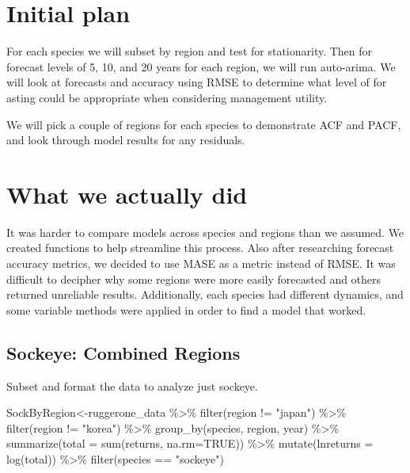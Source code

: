 \documentclass[
]{article}
\newenvironment{Shaded}{\begin{snugshade}}{\end{snugshade}}
\newcommand{\AttributeTok}[1]{\textcolor[rgb]{0.77,0.63,0.00}{#1}}
\newcommand{\ConstantTok}[1]{\textcolor[rgb]{0.00,0.00,0.00}{#1}}
\newcommand{\FunctionTok}[1]{\textcolor[rgb]{0.00,0.00,0.00}{#1}}
\newcommand{\NormalTok}[1]{#1}
\newcommand{\OtherTok}[1]{\textcolor[rgb]{0.56,0.35,0.01}{#1}}
\newcommand{\SpecialCharTok}[1]{\textcolor[rgb]{0.00,0.00,0.00}{#1}}
\newcommand{\StringTok}[1]{\textcolor[rgb]{0.31,0.60,0.02}{#1}}
\begin{document}
\hypertarget{initial-plan}{%
\section{Initial plan}\label{initial-plan}}

For each species we will subset by region and test for stationarity.
Then for forecast levels of 5, 10, and 20 years for each region, we will
run auto-arima. We will look at forecasts and accuracy using RMSE to
determine what level of for asting could be appropriate when considering
management utility.

We will pick a couple of regions for each species to demonstrate ACF and
PACF, and look through model results for any residuals.

\hypertarget{what-we-actually-did}{%
\section{What we actually did}\label{what-we-actually-did}}

It was harder to compare models across species and regions than we
assumed. We created functions to help streamline this process. Also
after researching forecast accuracy metrics, we decided to use MASE as a
metric instead of RMSE. It was difficult to decipher why some regions
were more easily forecasted and others returned unreliable results.
Additionally, each species had different dynamics, and some variable
methods were applied in order to find a model that worked.

\hypertarget{sockeye-combined-regions}{%
\subsection{Sockeye: Combined Regions}\label{sockeye-combined-regions}}

Subset and format the data to analyze just sockeye.

\begin{Shaded}
\begin{Highlighting}[]
\NormalTok{SockByRegion}\OtherTok{\textless{}{-}}\NormalTok{ruggerone\_data }\SpecialCharTok{\%\textgreater{}\%}
  \FunctionTok{filter}\NormalTok{(region }\SpecialCharTok{!=} \StringTok{"japan"}\NormalTok{) }\SpecialCharTok{\%\textgreater{}\%}
  \FunctionTok{filter}\NormalTok{(region }\SpecialCharTok{!=} \StringTok{"korea"}\NormalTok{) }\SpecialCharTok{\%\textgreater{}\%}
  \FunctionTok{group\_by}\NormalTok{(species, region, year) }\SpecialCharTok{\%\textgreater{}\%}
  \FunctionTok{summarize}\NormalTok{(}\AttributeTok{total =} \FunctionTok{sum}\NormalTok{(returns, }\AttributeTok{na.rm=}\ConstantTok{TRUE}\NormalTok{)) }\SpecialCharTok{\%\textgreater{}\%} 
  \FunctionTok{mutate}\NormalTok{(}\AttributeTok{lnreturns =} \FunctionTok{log}\NormalTok{(total)) }\SpecialCharTok{\%\textgreater{}\%}
  \FunctionTok{filter}\NormalTok{(species }\SpecialCharTok{==} \StringTok{"sockeye"}\NormalTok{)}
\end{Highlighting}
\end{Shaded}
\end{document}
